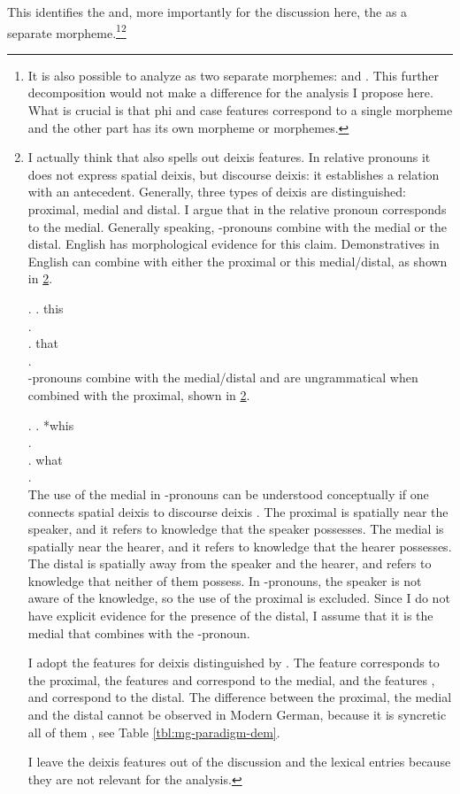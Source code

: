 This identifies the  and, more importantly for the discussion here, the  as a separate morpheme.\footnote{
It is also possible to analyze  as two separate morphemes:  and . This further decomposition would not make a difference for the analysis I propose here. What is crucial is that phi and case features correspond to a single morpheme and the other part has its own morpheme or morphemes.
}\footnote{
I actually think that  also spells out deixis features. In relative pronouns it does not express spatial deixis, but discourse deixis: it establishes a relation with an antecedent.
Generally, three types of deixis are distinguished: proximal, medial and distal. I argue that  in the relative pronoun corresponds to the medial. Generally speaking, -pronouns combine with the medial or the distal. English has morphological evidence for this claim. Demonstratives in English can combine with either the proximal or this medial/distal, as shown in \ref{ex:english-dem}.

\ex.\label{ex:english-dem}
 \ag. this\\
 .\\
 \bg. that\\
 .\\

-pronouns combine with the medial/distal and are ungrammatical when combined with the proximal, shown in \ref{ex:english-wh}.

\ex.\label{ex:english-wh}
 \ag. *whis\\
 .\\
 \bg. what\\
 .\\

The use of the medial in -pronouns can be understood conceptually if one connects spatial deixis to discourse deixis \citep[cf.][]{colasanti2019}. The proximal is spatially near the speaker, and it refers to knowledge that the speaker possesses. The medial is spatially near the hearer, and it refers to knowledge that the hearer possesses. The distal is spatially away from the speaker and the hearer, and refers to knowledge that neither of them possess. In -pronouns, the speaker is not aware of the knowledge, so the use of the proximal is excluded. Since I do not have explicit evidence for the presence of the distal, I assume that it is the medial that combines with the -pronoun.

I adopt the features for deixis distinguished by \citet{lander2018}. The feature  corresponds to the proximal, the features  and  correspond to the medial, and the features ,  and  correspond to the distal.
The difference between the proximal, the medial and the distal cannot be observed in Modern German, because it is syncretic all of them , see Table \ref{tbl:mg-paradigm-dem}.

I leave the deixis features out of the discussion and the lexical entries because they are not relevant for the analysis.}

